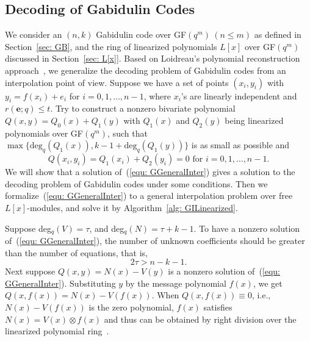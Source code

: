 \documentclass[11pt,onecolumn,draftcls]{IEEEtran}
\begin{document}
\subsection{Decoding of Gabidulin Codes}
We consider an $(n,k)$ Gabidulin code over GF$(q^m)~(n \le m)$ as defined in Section~\ref{sec: GB}, and the ring of linearized polynomials $L[x]$ over GF$(q^m)$ discussed in Section~\ref{sec: L[x]}. Based on Loidreau's polynomial reconstruction approach~\cite{loidreau_wcc05}, we generalize the decoding problem of Gabidulin codes from an interpolation point of view. Suppose we have a set of points $(x_i, y_i)$ with $y_i = f(x_i) + e_i$ for $i = 0, 1, \ldots, n-1$, where $x_i$'s are linearly independent and $r(\mathbf{e}; q) \le t$. Try to construct a nonzero bivariate polynomial $Q(x, y) = Q_0(x) + Q_1(y)$ with $Q_1(x)$ and $Q_2(y)$ being linearized polynomials over GF$(q^m)$, such that $\max \{\textrm{deg}_q (Q_1(x)), k - 1 + \textrm{deg}_q(Q_1(y))\}$ is as small as possible and
\begin{equation} \label{equ: GGeneralInter}
Q(x_i, y_i)  = Q_1(x_i) +Q_2(y_i) = 0 \textrm{ for } i = 0, 1, \ldots, n-1.
\end{equation}
We will show that a solution of~(\ref{equ: GGeneralInter}) gives a solution to the decoding problem of Gabidulin codes under some conditions. Then we formalize~(\ref{equ: GGeneralInter}) to a general interpolation problem over free $L[x]$-modules, and solve it by Algorithm~\ref{alg: GILinearized}.

Suppose deg$_q(V) = \tau$, and deg$_q(N) = \tau + k - 1$. To have a nonzero solution of~(\ref{equ: GGeneralInter}), the number of unknown coefficients should be greater than the number of equations, that is,
\begin{equation} \label{equ: tau1mod}
2\tau > n - k - 1.
\end{equation}
Next suppose $Q(x, y) = N(x) - V(y)$ is a nonzero solution of~(\ref{equ: GGeneralInter}). Substituting $y$ by the message polynomial $f(x)$, we get $Q(x, f(x)) = N(x) - V(f(x))$. When $Q(x, f(x)) \equiv 0$, i.e., $N(x) - V(f(x))$ is the zero polynomial, $f(x)$ satisfies $N(x) = V(x) \otimes f(x)$ and thus can be obtained by right division over the linearized polynomial ring~\cite{kotter_it08}.
\end{document}

